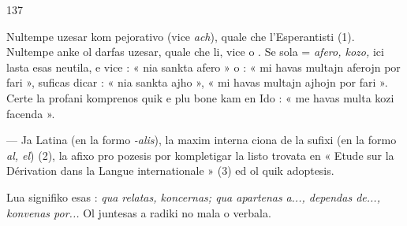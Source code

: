 \begin{VUpage}[141]{137}

Nultempe  uzesar kom pejorativo (vice \textit{ach}),\nl
quale che l'Esperantisti (1). Nultempe anke ol darfas uzesar,\nl
quale che li, vice  o . Se  sola = \textit{afero, kozo,}\nl
ici lasta esas neutila, e vice : « nia sankta afero » o : « mi\nl
havas multajn aferojn por fari », suficas dicar : « nia\nl
sankta ajho », « mi havas multajn ajhojn por fari ». Certe\nl
la profani komprenos quik e plu bone kam en Ido : « me\nl
havas multa kozi facenda ».

 --- Ja Latina (en la formo \textit{-alis}), la maxim interna\cc
ciona de la sufixi (en la formo \textit{al, el}) (2), la afixo  pro\cc
pozesis por kompletigar la listo trovata en « Etude sur la\nl
Dérivation dans la Langue internationale » (3) ed ol quik\nl
adoptesis.

Lua signifiko esas : \textit{qua relatas, koncernas; qua apartenas}\nl
\textit{a..., dependas de..., konvenas por...} Ol juntesas a radiki no\cc
mala o verbala.


\end{VUpage}
